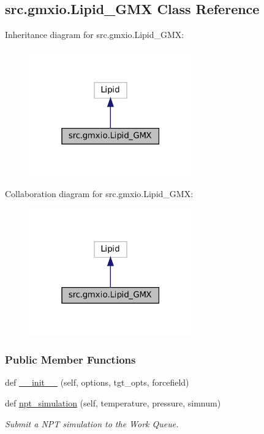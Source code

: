 \hypertarget{classsrc_1_1gmxio_1_1Lipid__GMX}{}\subsection{src.\+gmxio.\+Lipid\+\_\+\+G\+MX Class Reference}
\label{classsrc_1_1gmxio_1_1Lipid__GMX}


Inheritance diagram for src.\+gmxio.\+Lipid\+\_\+\+G\+MX\+:
\nopagebreak
\begin{figure}[H]
\begin{center}
\leavevmode
\includegraphics[width=199pt]{classsrc_1_1gmxio_1_1Lipid__GMX__inherit__graph}
\end{center}
\end{figure}


Collaboration diagram for src.\+gmxio.\+Lipid\+\_\+\+G\+MX\+:
\nopagebreak
\begin{figure}[H]
\begin{center}
\leavevmode
\includegraphics[width=199pt]{classsrc_1_1gmxio_1_1Lipid__GMX__coll__graph}
\end{center}
\end{figure}
\subsubsection*{Public Member Functions}
\begin{DoxyCompactItemize}
\item 
def \hyperlink{classsrc_1_1gmxio_1_1Lipid__GMX_a1259adba80d54fa54232b7a475d74adf}{\+\_\+\+\_\+init\+\_\+\+\_\+} (self, options, tgt\+\_\+opts, forcefield)
\item 
def \hyperlink{classsrc_1_1gmxio_1_1Lipid__GMX_a59162d9a53d7199604a0cb0c766c5ba4}{npt\+\_\+simulation} (self, temperature, pressure, simnum)
\begin{DoxyCompactList}\small\item\em Submit a N\+PT simulation to the Work Queue. \end{DoxyCompactList}\end{DoxyCompactItemize}
